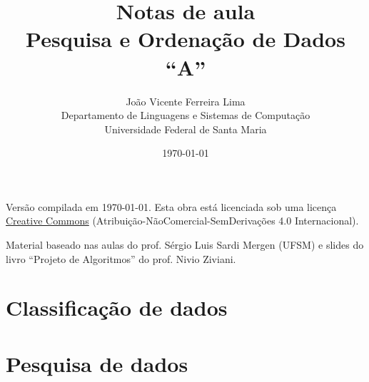 \documentclass[a4paper,12pt,twoside]{report}
\title{{\bf Notas de aula\\
Pesquisa e Ordenação de Dados ``A''}}
\author{
João Vicente Ferreira Lima\\
Departamento de Linguagens e Sistemas de Computação\\
Universidade Federal de Santa Maria
}
\date{\today}
\begin{document}
\maketitle

Versão compilada em \today.
Esta obra está licenciada sob uma licença \href{http://creativecommons.org/licenses/by-nc-nd/4.0/deed.pt_BR}{Creative Commons} (Atribuição-NãoComercial-SemDerivações 4.0 Internacional).

Material baseado nas aulas do prof. Sérgio Luis Sardi Mergen (UFSM) e slides do
livro ``Projeto de Algoritmos'' do prof. Nivio Ziviani.

\pagestyle{fancy}

\setcounter{tocdepth}{3}
\setcounter{secnumdepth}{3}
\tableofcontents



\part{Classificação de dados}



\part{Pesquisa de dados}


\end{document}
